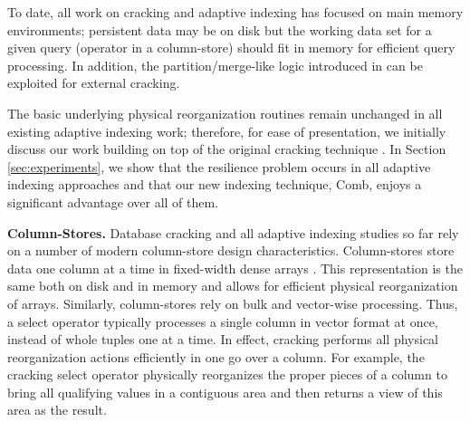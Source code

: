 To date, all work on cracking and adaptive indexing has focused on main memory environments;
persistent data may be on disk but the working data set for a given query (operator in a column-store)
should fit in memory for efficient query processing.
In addition, the partition/merge\hyp{}like logic introduced in \cite{AdaptiveIndexing,GK10a,GK10b}
can be exploited for external cracking. %


The basic underlying physical reorganization routines remain unchanged in all existing adaptive indexing work;
therefore, for ease of presentation, we initially discuss our work 
building on top of the original cracking technique \cite{IKM:CIDR07}.
In Section \ref{sec:experiments}, we show that the resilience problem occurs in all adaptive indexing approaches
and that our new indexing technique, Comb, enjoys a significant advantage over all of them.


\textbf{Column-Stores.}
Database cracking and all adaptive indexing studies so far rely on a number of modern column-store design characteristics.
Column-stores store data one column at a time in fixed-width dense arrays
\cite{manegold00, stonebreaker05vldb, X100}.
This representation is the same both on disk and in memory and allows for efficient
physical reorganization of arrays.
Similarly, column-stores rely on bulk and vector-wise processing.
Thus, a select operator typically processes a single column in vector format at once,
instead of whole tuples one at a time.
In effect, cracking performs all physical reorganization actions
efficiently in one go over a column. For example, the cracking select operator physically
reorganizes the proper pieces of a column to bring all qualifying values in a contiguous area
and then returns a view of this area as the result.
